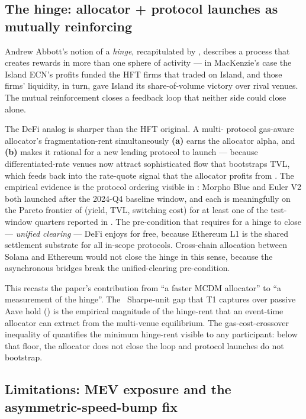 \subsection{The hinge: allocator + protocol launches as mutually reinforcing}
\label{sec:disc-hinge}

Andrew Abbott's notion of a \emph{hinge}, recapitulated by
\cite[pp.\,93--94]{mackenzie2021}, describes a process that
creates rewards in more than one sphere of activity --- in
MacKenzie's case the Island ECN's profits funded the HFT firms
that traded on Island, and those firms' liquidity, in turn, gave
Island its share-of-volume victory over rival venues.  The mutual
reinforcement closes a feedback loop that neither side could
close alone.

The DeFi analog is sharper than the HFT original.  A multi-
protocol gas-aware allocator's fragmentation-rent simultaneously
\textbf{(a)} earns the allocator alpha, and \textbf{(b)} makes
it rational for a new lending protocol to launch --- because
differentiated-rate venues now attract sophisticated flow that
bootstraps TVL, which feeds back into the rate-quote signal that
the allocator profits from \cite{gudgeon2020loanable}.  The
empirical evidence is the protocol ordering visible in
: Morpho Blue and Euler V2 both launched
after the 2024-Q4 baseline window, and each is meaningfully on
the Pareto frontier of (yield, TVL, switching cost) for at least
one of the test-window quarters reported in
.  The pre-condition that
\cite[p.\,95]{mackenzie2021} requires for a hinge to close ---
\emph{unified clearing} --- DeFi enjoys for free, because
Ethereum L1 is the shared settlement substrate for all in-scope
protocols.  Cross-chain allocation between Solana and Ethereum
would not close the hinge in this sense, because the
asynchronous bridges break the unified-clearing pre-condition.

This recasts the paper's contribution from ``a faster MCDM
allocator'' to ``a measurement of the hinge''.  The
\HOneAuxDelta\ Sharpe-unit gap that T1 captures over passive
Aave hold () is the empirical magnitude
of the hinge-rent that an event-time allocator can extract from
the multi-venue equilibrium.  The gas-cost-crossover inequality
of  quantifies the minimum hinge-rent
visible to any participant: below that floor, the allocator does
not close the loop and protocol launches do not bootstrap.

\subsection{Limitations: MEV exposure and the asymmetric-speed-bump fix}
\label{sec:disc-limits}


